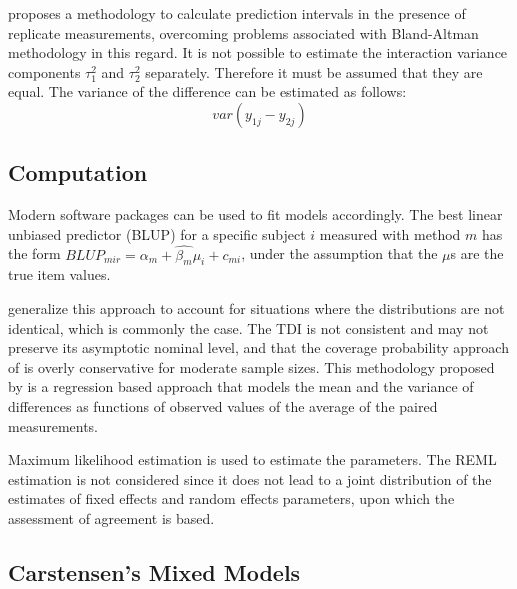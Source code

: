 \documentclass{report}
\begin{document}
\citet{BXC2008} proposes a methodology to calculate prediction
intervals in the presence of replicate measurements, overcoming
problems associated with Bland-Altman methodology in this regard.
It is not possible to estimate the interaction variance components
$\tau^{2}_{1}$ and $\tau^{2}_{2}$ separately. Therefore it must be
assumed that they are equal. The variance of the difference can be
estimated as follows:
\begin{equation}
	var(y_{1j}-y_{2j})
\end{equation}

\subsection{Computation} Modern software
packages can be used to fit models accordingly. The best linear
unbiased predictor (BLUP) for a specific subject $i$ measured with
method $m$ has the form $BLUP_{mir} = \hat{\alpha_{m}} +
\hat{\beta_{m}}\mu_{i} + c_{mi}$, under the assumption that the
$\mu$s are the true item values.






\newpage



\citet{pkcng} generalize this approach to account for situations
where the distributions are not identical, which is commonly the
case. The TDI is not consistent and may not preserve its
asymptotic nominal level, and that the coverage probability
approach of \citet{lin2002} is overly conservative for moderate
sample sizes. This methodology proposed by \citet{pkcng} is a
regression based approach that models the mean and the variance of
differences as functions of observed values of the average of the
paired measurements.

Maximum likelihood estimation is used to estimate the parameters.
The REML estimation is not considered since it does not lead to a
joint distribution of the estimates of fixed effects and random
effects parameters, upon which the assessment of agreement is
based.



\subsection{Carstensen's Mixed Models}
\end{document}
